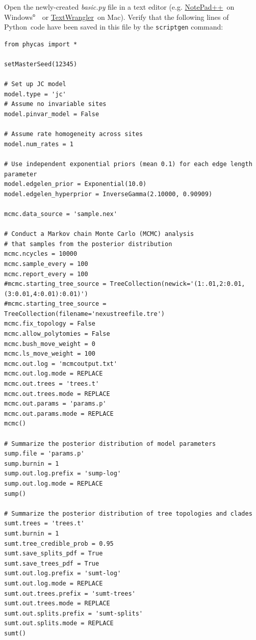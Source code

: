 \documentclass[10pt]{article}
\newcommand{\pathname}[1]{{\em #1}}				%
\newcommand{\cmd}[1]{{\tt \small #1}\index{#1}}	%
\newcommand{\Windows}{Windows$^{\mbox{\tiny\textregistered}}$ }
\newcommand{\textwrangler}{\href{http://www.barebones.com/products/TextWrangler/}{TextWrangler}}
\newcommand{\notepadpp}{\href{http://notepad-plus-plus.org/}{NotePad++}}
\newcommand{\python}{{\sc Python}\index{Python}}
\begin{document}
Open the newly-created \pathname{basic.py} file in a text editor (e.g. \notepadpp\ on \Windows\ or \textwrangler\ on Mac). Verify that the following lines of \python\ code have been saved in this file by the \cmd{scriptgen} command:
\begin{verbatim}
from phycas import *

setMasterSeed(12345)

# Set up JC model
model.type = 'jc'
# Assume no invariable sites
model.pinvar_model = False

# Assume rate homogeneity across sites
model.num_rates = 1

# Use independent exponential priors (mean 0.1) for each edge length parameter
model.edgelen_prior = Exponential(10.0)
model.edgelen_hyperprior = InverseGamma(2.10000, 0.90909)

mcmc.data_source = 'sample.nex'

# Conduct a Markov chain Monte Carlo (MCMC) analysis 
# that samples from the posterior distribution
mcmc.ncycles = 10000
mcmc.sample_every = 100
mcmc.report_every = 100
#mcmc.starting_tree_source = TreeCollection(newick='(1:.01,2:0.01,(3:0.01,4:0.01):0.01)')
#mcmc.starting_tree_source = TreeCollection(filename='nexustreefile.tre')
mcmc.fix_topology = False
mcmc.allow_polytomies = False
mcmc.bush_move_weight = 0
mcmc.ls_move_weight = 100
mcmc.out.log = 'mcmcoutput.txt'
mcmc.out.log.mode = REPLACE
mcmc.out.trees = 'trees.t'
mcmc.out.trees.mode = REPLACE
mcmc.out.params = 'params.p'
mcmc.out.params.mode = REPLACE
mcmc()

# Summarize the posterior distribution of model parameters
sump.file = 'params.p'
sump.burnin = 1
sump.out.log.prefix = 'sump-log'
sump.out.log.mode = REPLACE
sump()

# Summarize the posterior distribution of tree topologies and clades
sumt.trees = 'trees.t'
sumt.burnin = 1
sumt.tree_credible_prob = 0.95 
sumt.save_splits_pdf = True
sumt.save_trees_pdf = True
sumt.out.log.prefix = 'sumt-log'
sumt.out.log.mode = REPLACE
sumt.out.trees.prefix = 'sumt-trees'
sumt.out.trees.mode = REPLACE
sumt.out.splits.prefix = 'sumt-splits'
sumt.out.splits.mode = REPLACE
sumt()
\end{verbatim}

\end{document}
